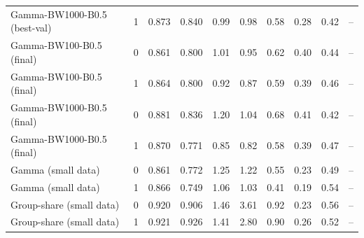 \begin{tabular}{llrrrrrrrc}
Gamma-BW1000-B0.5 (best-val) & 1 & 0.873 & 0.840 & 0.99 & 0.98 & 0.58 & 0.28 & 0.42 & -- \\
Gamma-BW100-B0.5 (final) & 0 & 0.861 & 0.800 & 1.01 & 0.95 & 0.62 & 0.40 & 0.44 & -- \\
Gamma-BW100-B0.5 (final) & 1 & 0.864 & 0.800 & 0.92 & 0.87 & 0.59 & 0.39 & 0.46 & -- \\
Gamma-BW1000-B0.5 (final) & 0 & 0.881 & 0.836 & 1.20 & 1.04 & 0.68 & 0.41 & 0.42 & -- \\
Gamma-BW1000-B0.5 (final) & 1 & 0.870 & 0.771 & 0.85 & 0.82 & 0.58 & 0.39 & 0.47 & -- \\
Gamma (small data) & 0 & 0.861 & 0.772 & 1.25 & 1.22 & 0.55 & 0.23 & 0.49 & -- \\
Gamma (small data) & 1 & 0.866 & 0.749 & 1.06 & 1.03 & 0.41 & 0.19 & 0.54 & -- \\
Group-share (small data) & 0 & 0.920 & 0.906 & 1.46 & 3.61 & 0.92 & 0.23 & 0.56 & -- \\
Group-share (small data) & 1 & 0.921 & 0.926 & 1.41 & 2.80 & 0.90 & 0.26 & 0.52 & -- \\
\bottomrule
\end{tabular}
